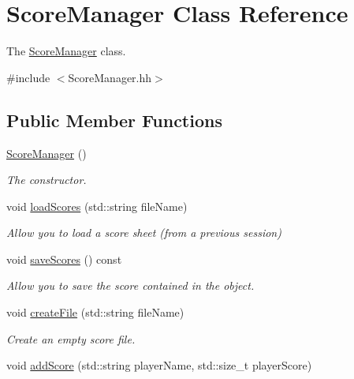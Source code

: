 \hypertarget{classScoreManager}{}\section{Score\+Manager Class Reference}
\label{classScoreManager}


The \hyperlink{classScoreManager}{Score\+Manager} class.  




{\ttfamily \#include $<$Score\+Manager.\+hh$>$}

\subsection*{Public Member Functions}
\begin{DoxyCompactItemize}
\item 
\hyperlink{classScoreManager_a4f3866ff832127664543349da5c4fbf4}{Score\+Manager} ()
\begin{DoxyCompactList}\small\item\em The constructor. \end{DoxyCompactList}\item 
void \hyperlink{classScoreManager_a4c345e9d06ef6f7fb937c43fa51dddd5}{load\+Scores} (std\+::string file\+Name)
\begin{DoxyCompactList}\small\item\em Allow you to load a score sheet (from a previous session) \end{DoxyCompactList}\item 
\mbox{\label{classScoreManager_aa3f390fe5076324b2d457de0c43af59f}} 
void \hyperlink{classScoreManager_aa3f390fe5076324b2d457de0c43af59f}{save\+Scores} () const
\begin{DoxyCompactList}\small\item\em Allow you to save the score contained in the object. \end{DoxyCompactList}\item 
void \hyperlink{classScoreManager_abbe17770ef85b2575fd14acf90a0bc9f}{create\+File} (std\+::string file\+Name)
\begin{DoxyCompactList}\small\item\em Create an empty score file. \end{DoxyCompactList}\item 
void \hyperlink{classScoreManager_a9fba97d65a88e67a2d219d2ba36af111}{add\+Score} (std\+::string player\+Name, std\+::size\+\_\+t player\+Score)

\end{DoxyCompactItemize}
